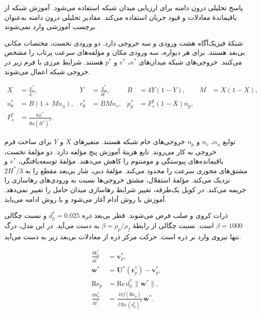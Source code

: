 پاسخ تحلیلی درون دامنه برای ارزیابی میدان شبکه استفاده می‌شود.
آموزش شبکه از باقیماندهٔ معادلات و قیود جریان استفاده می‌کند.
مقادیر تحلیلی درون دامنه به‌عنوان برچسب آموزشی وارد نمی‌شوند.

شبکهٔ فیزیک‌آگاه هشت ورودی و سه خروجی دارد.
دو ورودی نخست، مختصات مکانی بی‌بعد هستند.
برای هر دیواره، سه ورودی مکان و مؤلفه‌های سرعت پرتاب را مشخص می‌کنند.
خروجی‌های شبکه میدان‌های $u^*$، $v^*$ و $p^*$ هستند.
شرایط مرزی با فرم زیر در خروجی شبکه اعمال می‌شوند.

\begin{equation}
\begin{aligned}
X &= \frac{x^*}{L^*},
&Y &= \frac{y^*}{H^*},
&B &= 4Y(1-Y),
&M &= X(1-X),\\
u_\theta^* &= B(1+M n_u),
&v_\theta^* &= B M n_v,
&p_\theta^* &= P_s^*(1-X)n_p,\\[-2pt]
P_s^* &= \frac{8L^*}{\mathrm{Re}(H^*)^2}.&&&&
\end{aligned}
\label{eq:formation-pinn-output}
\end{equation}

توابع $n_u$، $n_v$ و $n_p$ خروجی‌های خام شبکه هستند.
متغیرهای $X$ و $Y$ برای ساخت فرم خروجی به کار می‌روند.
تابع هزینهٔ آموزش پنج مؤلفه دارد.
دو مؤلفهٔ نخست، باقیمانده‌های پیوستگی و مومنتوم را کاهش می‌دهند.
مؤلفهٔ توسعه‌یافتگی، $v^*$ و مشتق‌های محوری سرعت را محدود می‌کند.
مؤلفهٔ دبی، شار بی‌بعد مقطع را به $2H^*/3$ نزدیک می‌کند.
مؤلفهٔ استقلال، مشتق خروجی‌ها نسبت به ورودی‌های رهاسازی را جریمه می‌کند.
در کوپل یک‌طرفه، تغییر شرایط رهاسازی میدان حامل را تغییر نمی‌دهد.
آموزش با روش آدام آغاز می‌شود و با روش  ادامه می‌یابد.

\label{sec:formation-particle-ode}

ذرات کروی و صلب فرض می‌شوند.
قطر بی‌بعد ذره $d_p^*=0.025$ و نسبت چگالی $\beta=1000$ است.
نسبت چگالی از رابطهٔ $\beta=\rho_p/\rho_f$ به دست می‌آید.
در این مدل، درگ تنها نیروی وارد بر ذره است.
حرکت مرکز ذره از معادلات بی‌بعد زیر به دست می‌آید.

\begin{equation}
\begin{aligned}
\frac{\mathrm d\mathbf r_p^*}{\mathrm dt^*} &= \mathbf v_p^*,\\
\mathbf w^* &=
  \mathbf U^*(\mathbf r_p^*)-\mathbf v_p^*,\\
\mathrm{Re}_p &= \mathrm{Re}\,d_p^*\,\|\mathbf w^*\|,\\
\frac{\mathrm d\mathbf v_p^*}{\mathrm dt^*}
  &= \frac{18 f(\mathrm{Re}_p)}{\beta\,\mathrm{Re}\,(d_p^*)^2}\,\mathbf w^* .
\end{aligned}
\label{eq:formation-particle-ode}
\end{equation}

